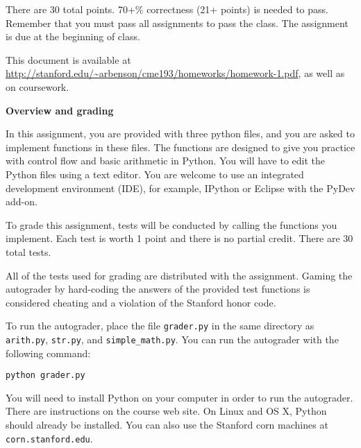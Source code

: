 \documentclass{article}
\newcounter{points}
\begin{document}
\pagestyle{fancy}

There are 30 total points.  70+\% correctness (21+ points) is needed to pass.  Remember that you must pass all assignments to pass the class.  The assignment is due at the beginning of class.

This document is available at \url{http://stanford.edu/~arbenson/cme193/homeworks/homework-1.pdf}, as well as on coursework.

\vspace{0.3in}

\textbf{Overview and grading}

In this assignment, you are provided with three python files, and you are asked to implement functions in these files.  The functions are designed to give you practice with control flow and basic arithmetic in Python.  You will have to edit the Python files using a text editor.  You are welcome to use an integrated development environment (IDE), for example, IPython or Eclipse with the PyDev add-on.

To grade this assignment, tests will be conducted by calling the functions you implement.  Each test is worth 1 point and there is no partial credit.  There are 30 total tests.

All of the tests used for grading are distributed with the assignment.  Gaming the autograder by hard-coding the answers of the provided test functions is considered cheating and a violation of the Stanford honor code.

To run the autograder, place the file \texttt{grader.py} in the same directory as \texttt{arith.py}, \texttt{str.py}, and \texttt{simple\_math.py}.  You can run the autograder with the following command:
\begin{center}
\texttt{python grader.py}
\end{center}

You will need to install Python on your computer in order to run the autograder.  There are instructions on the course web site.  On Linux and OS X, Python should already be installed.  You can also use the Stanford corn machines at \texttt{corn.stanford.edu}.

\vspace{0.2in}
\end{document}

